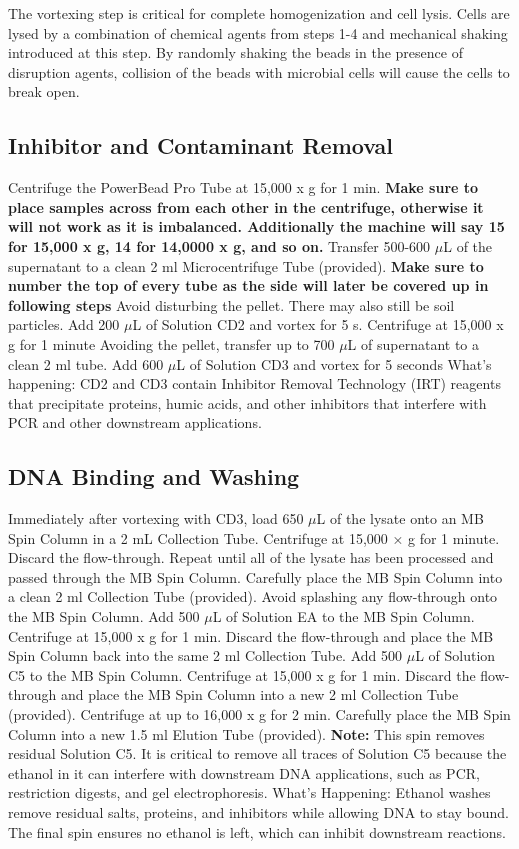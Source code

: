 \documentclass[12pt]{SOP5_beta}\usepackage[]{graphicx}\usepackage[]{xcolor}
\begin{document}
\noindent The vortexing step is critical for complete homogenization and cell lysis. Cells are lysed by a combination of chemical agents from steps 1-4 and mechanical shaking introduced at this step. By randomly shaking the beads in the presence of disruption agents, collision of the beads with microbial cells will cause the cells to break open.

\subsection*{Inhibitor and Contaminant Removal}
\NP Centrifuge the PowerBead Pro Tube at 15,000 x g for 1 min. \textbf{Make sure to place samples across from each other in the centrifuge, otherwise it will not work as it is imbalanced. Additionally the machine will say 15 for 15,000 x g, 14 for 14,0000 x g, and so on.}
\NP Transfer 500-600 $\mu$L of the supernatant to a clean 2 ml Microcentrifuge Tube (provided). \textbf{Make sure to number the top of every tube as the side will later be covered up in following steps} Avoid disturbing the pellet. There may also still be soil particles.
\NP Add 200 $\mu$L of Solution CD2 and vortex for 5 s.
\NP Centrifuge at 15,000 x g for 1 minute
\NP Avoiding the pellet, transfer up to 700 $\mu$L of supernatant to a clean 2 ml tube. 
\NP Add 600 $\mu$L of Solution CD3 and vortex for 5 seconds
\noindent What's happening: CD2 and CD3 contain Inhibitor Removal Technology (IRT) reagents that precipitate proteins, humic acids, and other inhibitors that interfere with PCR and other downstream applications.
\subsection*{DNA Binding and Washing}
\NP Immediately after vortexing with CD3, load 650 $\mu$L of the lysate onto an MB Spin Column in a 2 mL Collection Tube.
\NP Centrifuge at 15,000 × g for 1 minute. Discard the flow-through.
Repeat until all of the lysate has been processed and passed through the MB Spin Column.
\NP Carefully place the MB Spin Column into a clean 2 ml Collection Tube (provided). Avoid splashing any flow-through onto the MB Spin Column.
\NP Add 500 $\mu$L of Solution EA to the MB Spin Column. Centrifuge at 15,000 x g for 1 min.
\NP Discard the flow-through and place the MB Spin Column back into the same 2 ml Collection Tube.
\NP Add 500 $\mu$L of Solution C5 to the MB Spin Column. Centrifuge at 15,000 x g for 1 min.
\NP Discard the flow-through and place the MB Spin Column into a new 2 ml Collection Tube (provided).
\NP Centrifuge at up to 16,000 x g for 2 min. Carefully place the MB Spin Column into a new 1.5 ml Elution Tube (provided). \textbf{Note:} This spin removes residual Solution C5. It is critical to remove all traces of
Solution C5 because the ethanol in it can interfere with downstream DNA applications, such as PCR, restriction digests, and gel electrophoresis.
\noindent What's Happening: Ethanol washes remove residual salts, proteins, and inhibitors while allowing DNA to stay bound. The final spin ensures no ethanol is left, which can inhibit downstream reactions.
\end{document}
